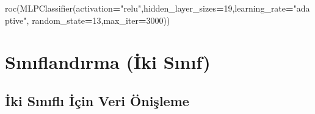 \documentclass[12pt,twoside]{deuthesis}
\newenvironment{Shaded}{\begin{snugshade}}{\end{snugshade}}
\newcommand{\DecValTok}[1]{\textcolor[rgb]{0.00,0.00,0.81}{#1}}
\newcommand{\NormalTok}[1]{#1}
\newcommand{\OperatorTok}[1]{\textcolor[rgb]{0.81,0.36,0.00}{\textbf{#1}}}
\newcommand{\StringTok}[1]{\textcolor[rgb]{0.31,0.60,0.02}{#1}}
\begin{document}
\begin{Shaded}
\begin{Highlighting}[]
\NormalTok{roc(MLPClassifier(activation}\OperatorTok{=}\StringTok{"relu"}\NormalTok{,hidden\_layer\_sizes}\OperatorTok{=}\DecValTok{19}\NormalTok{,learning\_rate}\OperatorTok{=}\StringTok{"adaptive"}\NormalTok{,}
\NormalTok{                  random\_state}\OperatorTok{=}\DecValTok{13}\NormalTok{,max\_iter}\OperatorTok{=}\DecValTok{3000}\NormalTok{))}
\end{Highlighting}
\end{Shaded}
\normalsize

\hypertarget{sux131nux131flandux131rma-iki-sux131nux131f}{%
\chapter{Sınıflandırma (İki Sınıf)}\label{sux131nux131flandux131rma-iki-sux131nux131f}}

\hypertarget{iki-sux131nux131flux131-iuxe7in-veri-uxf6niux15fleme}{%
\section{İki Sınıflı İçin Veri Önişleme}\label{iki-sux131nux131flux131-iuxe7in-veri-uxf6niux15fleme}}
\end{document}
